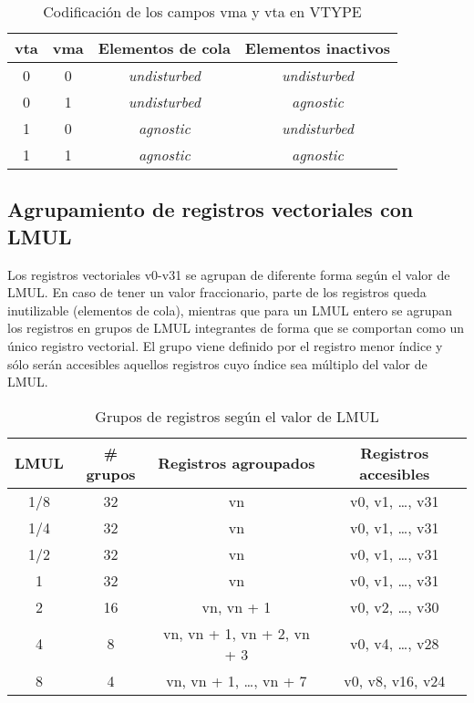 \begin{table}[H]
    \begin{tabular}{@{}cccc@{}}
    \toprule
    vta & vma & Elementos de cola & Elementos inactivos\\
    \midrule
    0 & 0 & \textit{undisturbed} & \textit{undisturbed}\\
    0 & 1 & \textit{undisturbed} & \textit{agnostic}\\
    1 & 0 & \textit{agnostic} & \textit{undisturbed}\\
    1 & 1 & \textit{agnostic} & \textit{agnostic}\\
    \bottomrule
    \end{tabular}
    \caption{Codificación de los campos vma y vta  en VTYPE}
\end{table}


\subsection{Agrupamiento de registros vectoriales con LMUL}\label{mapping-registers-with-lmul}
Los registros vectoriales v0-v31 se agrupan de diferente forma según el valor
de LMUL. En caso de tener un valor fraccionario, parte de los registros queda
inutilizable (elementos de cola), mientras que para un LMUL entero se agrupan
los registros en grupos de LMUL integrantes de forma que se comportan como un
único registro vectorial. El grupo viene definido por el registro menor índice
y sólo serán accesibles aquellos registros cuyo índice sea múltiplo del valor
de LMUL\@.

\begin{table}[H]
    \begin{tabular}{@{}cccc@{}}
    \toprule
    LMUL & \# grupos & Registros agroupados & Registros accesibles\\
    \midrule
    1/8 & 32 & vn & v0, v1, \dots, v31\\
    1/4 & 32 & vn & v0, v1, \dots, v31\\
    1/2 & 32 & vn & v0, v1, \dots, v31\\
    1   & 32 & vn & v0, v1, \dots, v31\\
    2   & 16 & vn, vn + 1 & v0, v2, \dots, v30\\
    4   & 8  & vn, vn + 1, vn + 2, vn + 3 & v0, v4, \dots, v28\\
    8   & 4  & vn, vn + 1, \dots, vn + 7  & v0, v8, v16, v24\\
    \bottomrule
    \end{tabular}
    \caption{Grupos de registros según el valor de LMUL}
\end{table}

